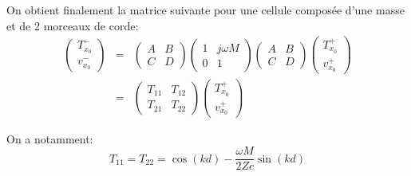\documentclass[xcolor=x11names,compress]{beamer}
\renewcommand{\(}{\begin{columns}}
\renewcommand{\)}{\end{columns}}
\newcommand{\<}[1]{\begin{column}{#1}}
\renewcommand{\>}{\end{column}}
\begin{document}
\begin{frame}
On obtient finalement la matrice suivante pour une cellule composée d'une masse et de 2 morceaux de corde:
\begin{eqnarray*}
\begin{pmatrix} T_{x_0}^{-} \\ v_{x_0}^{-} \end{pmatrix} & = & \begin{pmatrix} A & B \\ C & D \end{pmatrix}\begin{pmatrix} 1 & j \omega M \\ 0 & 1 \end{pmatrix} \begin{pmatrix} A & B \\ C & D \end{pmatrix}  \begin{pmatrix} T_{x_0}^{+} \\ v_{x_0}^{+} \end{pmatrix} \\
& = & \begin{pmatrix} T_{11} & T_{12}\\ T_{21} & T_{22} \end{pmatrix} \begin{pmatrix} T_{x_0}^{+} \\ v_{x_0}^{+} \end{pmatrix}
\end{eqnarray*}

On a notamment:
\begin{equation}
T_{11}   = T_{22} = \cos(kd) - \frac{\omega M}{2 Zc}\sin(kd) 
\end{equation}
\end{frame}
\end{document}
